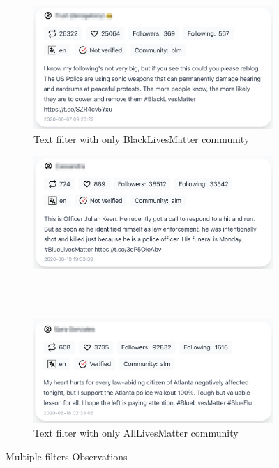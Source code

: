 \begin{figure}[H]
\begin{subfigure}{.5\textwidth}
  \includegraphics[width=1\linewidth]{Report-latex/tex_files/pics/example/obserpb2.png}
  \caption{Text filter with only BlackLivesMatter community}
  \label{fig:sub-second}
\end{subfigure}

\begin{subfigure}{.5\textwidth}
  \centering
  \captionsetup{justification=centering}
  \includegraphics[width=1\linewidth]{Report-latex/tex_files/pics/example/obserpa1.png}
  
  \\\
  
  \includegraphics[width=1\linewidth]{Report-latex/tex_files/pics/example/obserpa2.png}
  \caption{Text filter with only AllLivesMatter community}
  \label{fig:sub-second}
\end{subfigure}

\captionsetup{justification=centering}
\caption{Multiple filters Observations}
\label{fig:e-m-f-obs}
\end{figure}



